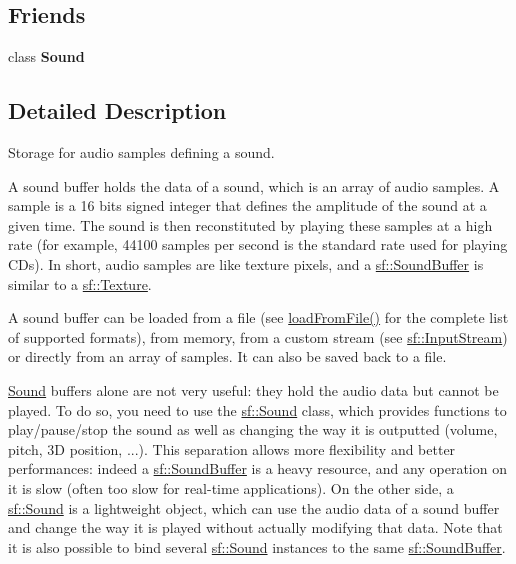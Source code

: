 \subsection*{Friends}
\begin{DoxyCompactItemize}
\item 
\mbox{\label{classsf_1_1_sound_buffer_a50914f77c7cf4fb97616c898c5291f4b}} 
class {\bfseries Sound}
\end{DoxyCompactItemize}


\subsection{Detailed Description}
Storage for audio samples defining a sound. 

A sound buffer holds the data of a sound, which is an array of audio samples. A sample is a 16 bits signed integer that defines the amplitude of the sound at a given time. The sound is then reconstituted by playing these samples at a high rate (for example, 44100 samples per second is the standard rate used for playing C\+Ds). In short, audio samples are like texture pixels, and a \hyperlink{classsf_1_1_sound_buffer}{sf\+::\+Sound\+Buffer} is similar to a \hyperlink{classsf_1_1_texture}{sf\+::\+Texture}.

A sound buffer can be loaded from a file (see \hyperlink{classsf_1_1_sound_buffer_a2be6a8025c97eb622a7dff6cf2594394}{load\+From\+File()} for the complete list of supported formats), from memory, from a custom stream (see \hyperlink{classsf_1_1_input_stream}{sf\+::\+Input\+Stream}) or directly from an array of samples. It can also be saved back to a file.

\hyperlink{classsf_1_1_sound}{Sound} buffers alone are not very useful\+: they hold the audio data but cannot be played. To do so, you need to use the \hyperlink{classsf_1_1_sound}{sf\+::\+Sound} class, which provides functions to play/pause/stop the sound as well as changing the way it is outputted (volume, pitch, 3D position, ...). This separation allows more flexibility and better performances\+: indeed a \hyperlink{classsf_1_1_sound_buffer}{sf\+::\+Sound\+Buffer} is a heavy resource, and any operation on it is slow (often too slow for real-\/time applications). On the other side, a \hyperlink{classsf_1_1_sound}{sf\+::\+Sound} is a lightweight object, which can use the audio data of a sound buffer and change the way it is played without actually modifying that data. Note that it is also possible to bind several \hyperlink{classsf_1_1_sound}{sf\+::\+Sound} instances to the same \hyperlink{classsf_1_1_sound_buffer}{sf\+::\+Sound\+Buffer}.

